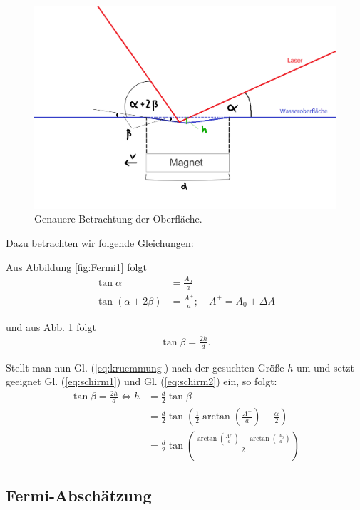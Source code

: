 \documentclass[11pt,a4paper,titlepage, ngerman]{article}
\newcommand{\refeq}[1]{Gl. (\ref{eq:#1})}
\begin{document}
		\begin{figure}[ht]
			\includegraphics[width=\textwidth]{SkizzeFermi2.png}
			\caption{Genauere Betrachtung der Oberfläche.}
			\label{fig:Fermi2}
		\end{figure}
	
		Dazu betrachten wir folgende Gleichungen:
		
		Aus Abbildung \ref{fig:Fermi1} folgt
		\begin{align}
			\tan \alpha &= \frac{A_0}{a}
			\label{eq:schirm1}\\
			\tan (\alpha + 2 \beta) &= \frac{A^+}{a};\quad A^+ = A_0+\Delta A
			\label{eq:schirm2}
		\end{align}
		
		und aus Abb. \ref{fig:Fermi2} folgt
			\begin{align}
			\tan \beta = \frac{2 h}{d}.
			\label{eq:kruemmung}
		\end{align}
											
		Stellt man nun \refeq{kruemmung} nach der gesuchten Größe $h$ um und setzt geeignet \refeq{schirm1} und \refeq{schirm2} ein, so folgt:	
		\begin{align*}
			\tan \beta = \frac{2h}{d} \Leftrightarrow h &= \frac{d}{2} \tan \beta\\
			&= \frac{d}{2} \tan \left( \frac{1}{2}\arctan \left( \frac{A^+}{a}\right) - \frac{\alpha}{2}\right)\\
			&= \frac{d}{2} \tan \left( \frac{\arctan \left( \frac{A^+}{a}\right) - \arctan\left( \frac{A_0}{a}\right)}{2} \right)
		\end{align*}
				
		\subsection*{Fermi-Abschätzung}
				
\end{document}
